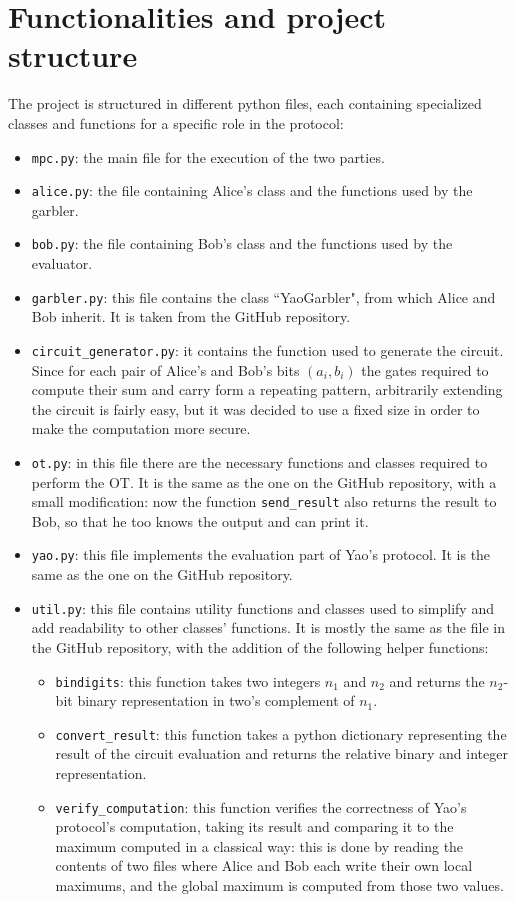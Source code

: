 \section{Functionalities and project structure}

The project is structured in different python files, each containing specialized classes and functions for a specific role in the protocol:

\begin{itemize}
    \item \texttt{mpc.py}: the main file for the execution of the two parties.
    \item \texttt{alice.py}: the file containing Alice's class and the functions used by the garbler.
    \item \texttt{bob.py}: the file containing Bob's class and the functions used by the evaluator.
    \item \texttt{garbler.py}: this file contains the class ``YaoGarbler", from which Alice and Bob inherit. It is taken from the GitHub repository.
    \item \texttt{circuit\_generator.py}: it contains the function used to generate the circuit. Since for each pair of Alice's and Bob's bits $(a_i, b_i)$ the gates required to compute their sum and carry form a repeating pattern, arbitrarily extending the circuit is fairly easy, but it was decided to use a fixed size in order to make the computation more secure.
    \item \texttt{ot.py}: in this file there are the necessary functions and classes required to perform the OT. It is the same as the one on the GitHub repository, with a small modification: now the function \texttt{send\_result} also returns the result to Bob, so that he too knows the output and can print it.
    \item \texttt{yao.py}: this file implements the evaluation part of Yao's protocol. It is the same as the one on the GitHub repository.
    \item \texttt{util.py}: this file contains utility functions and classes used to simplify and add readability to other classes' functions. It is mostly the same as the file in the GitHub repository, with the addition of the following helper functions:
    \begin{itemize}
        \item \texttt{bindigits}: this function takes two integers $n_1$ and $n_2$ and returns the $n_2$-bit binary representation in two's complement of $n_1$.
        \item \texttt{convert\_result}: this function takes a python dictionary representing the result of the circuit evaluation and returns the relative binary and integer representation.
        \item \texttt{verify\_computation}: this function verifies the correctness of Yao's protocol's computation, taking its result and comparing it to the maximum computed in a classical way: this is done by reading the contents of two files where Alice and Bob each write their own local maximums, and the global maximum is computed from those two values.
    \end{itemize}
\end{itemize}